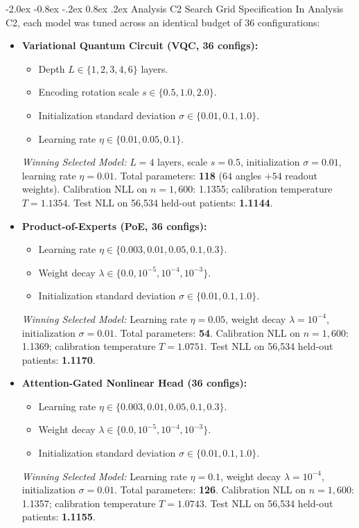 \documentclass[10pt,a4paper]{article}
\makeatletter
\renewcommand{\subsection}{\@startsection{subsection}{2}{\z@}%
  {-2.0ex \@plus -0.8ex \@minus -.2ex}%
  {0.8ex \@plus.2ex}%
  {\normalfont\large\sffamily\bfseries\color{naturedark}}}
\makeatother
\begin{document}
\subsection{Analysis C2 Search Grid Specification}
In Analysis C2, each model was tuned across an identical budget of 36 configurations:
\begin{itemize}
  \item \textbf{Variational Quantum Circuit (VQC, 36 configs):}
    \begin{itemize}
      \item Depth $L \in \{1, 2, 3, 4, 6\}$ layers.
      \item Encoding rotation scale $s \in \{0.5, 1.0, 2.0\}$.
      \item Initialization standard deviation $\sigma \in \{0.01, 0.1, 1.0\}$.
      \item Learning rate $\eta \in \{0.01, 0.05, 0.1\}$.
    \end{itemize}
    \textit{Winning Selected Model:} $L=4$ layers, scale $s=0.5$, initialization $\sigma=0.01$, learning rate $\eta=0.01$. Total parameters: \textbf{118} ($64$ angles $+ 54$ readout weights). Calibration NLL on $n=1,600$: 1.1355; calibration temperature $T = 1.1354$. Test NLL on 56,534 held-out patients: \textbf{1.1144}.
  \item \textbf{Product-of-Experts (PoE, 36 configs):}
    \begin{itemize}
      \item Learning rate $\eta \in \{0.003, 0.01, 0.05, 0.1, 0.3\}$.
      \item Weight decay $\lambda \in \{0.0, 10^{-5}, 10^{-4}, 10^{-3}\}$.
      \item Initialization standard deviation $\sigma \in \{0.01, 0.1, 1.0\}$.
    \end{itemize}
    \textit{Winning Selected Model:} Learning rate $\eta=0.05$, weight decay $\lambda=10^{-4}$, initialization $\sigma=0.01$. Total parameters: \textbf{54}. Calibration NLL on $n=1,600$: 1.1369; calibration temperature $T = 1.0751$. Test NLL on 56,534 held-out patients: \textbf{1.1170}.
  \item \textbf{Attention-Gated Nonlinear Head (36 configs):}
    \begin{itemize}
      \item Learning rate $\eta \in \{0.003, 0.01, 0.05, 0.1, 0.3\}$.
      \item Weight decay $\lambda \in \{0.0, 10^{-5}, 10^{-4}, 10^{-3}\}$.
      \item Initialization standard deviation $\sigma \in \{0.01, 0.1, 1.0\}$.
    \end{itemize}
    \textit{Winning Selected Model:} Learning rate $\eta=0.1$, weight decay $\lambda=10^{-4}$, initialization $\sigma=0.01$. Total parameters: \textbf{126}. Calibration NLL on $n=1,600$: 1.1357; calibration temperature $T = 1.0743$. Test NLL on 56,534 held-out patients: \textbf{1.1155}.
\end{itemize}
\end{document}
